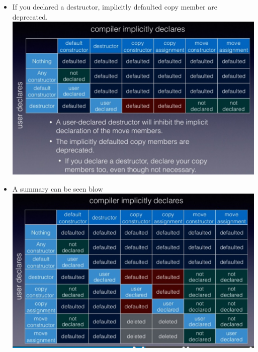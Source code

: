 \documentclass[a4paper,12pt,twoside]{book}
\begin{document}
\begin{itemize}
\item If you declared a destructor, implicitly defaulted copy member are deprecated.  \\
\includegraphics[scale=0.6]{pics/sm4.png} \newline


\item A summary can be seen blow \\
\includegraphics[scale=0.6]{pics/sm3.png} \newline

\end{itemize}
\end{document}
